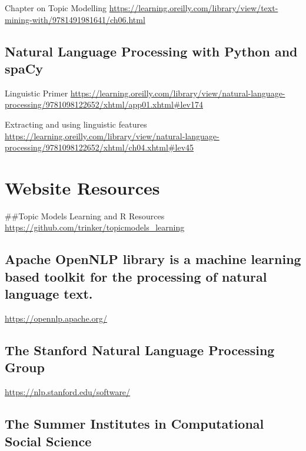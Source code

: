 \documentclass[
]{book}
\begin{document}
Chapter on Topic Modelling
\url{https://learning.oreilly.com/library/view/text-mining-with/9781491981641/ch06.html}

\hypertarget{natural-language-processing-with-python-and-spacy}{%
\section{Natural Language Processing with Python and spaCy}\label{natural-language-processing-with-python-and-spacy}}

Linguistic Primer
\url{https://learning.oreilly.com/library/view/natural-language-processing/9781098122652/xhtml/app01.xhtml\#lev174}

Extracting and using linguistic features
\url{https://learning.oreilly.com/library/view/natural-language-processing/9781098122652/xhtml/ch04.xhtml\#lev45}

\hypertarget{website-resources}{%
\chapter{Website Resources}\label{website-resources}}

\#\#Topic Models Learning and R Resources
\url{https://github.com/trinker/topicmodels_learning}

\hypertarget{apache-opennlp-library-is-a-machine-learning-based-toolkit-for-the-processing-of-natural-language-text.}{%
\section{Apache OpenNLP library is a machine learning based toolkit for the processing of natural language text.}\label{apache-opennlp-library-is-a-machine-learning-based-toolkit-for-the-processing-of-natural-language-text.}}

\url{https://opennlp.apache.org/}

\hypertarget{the-stanford-natural-language-processing-group}{%
\section{The Stanford Natural Language Processing Group}\label{the-stanford-natural-language-processing-group}}

\url{https://nlp.stanford.edu/software/}

\hypertarget{the-summer-institutes-in-computational-social-science}{%
\section{The Summer Institutes in Computational Social Science}\label{the-summer-institutes-in-computational-social-science}}
\end{document}
